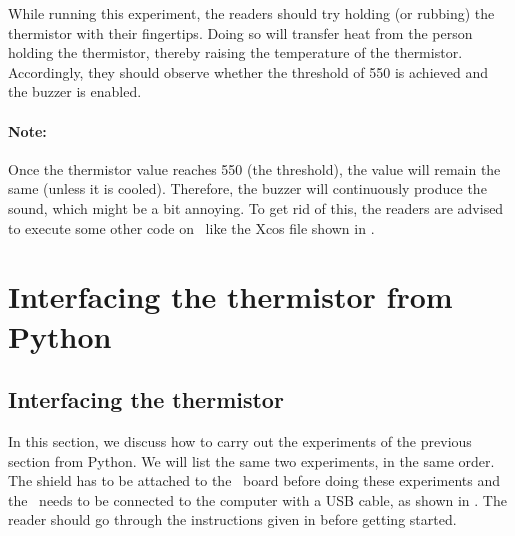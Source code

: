 \begin{enumerate}
        While running this experiment,
        the readers should try holding (or rubbing) the thermistor with their fingertips.
        Doing so will transfer heat from the person holding the
        thermistor, thereby raising the temperature of the thermistor.
        Accordingly, they should observe whether the threshold of 550 is achieved
        and the buzzer is enabled.

        \paragraph{Note:} Once the thermistor value reaches 550 (the threshold), the value will remain the same
        (unless it is cooled). Therefore, the buzzer will continuously produce the sound, which might be
        a bit annoying. To get rid of this, the readers are advised to
        execute some other code on \arduino\ like the Xcos file shown in
        .
\end{enumerate}


\section{Interfacing the thermistor from Python}
\subsection{Interfacing the thermistor}
In this section, we discuss how to carry out the experiments of the
previous section from Python.  We will list the same two experiments,
in the same order.  The shield has to be attached to the \arduino\ board
before doing these experiments and the \arduino\ needs to be connected to the computer
with a USB cable, as shown in .
The reader should go through the instructions given in
 before getting started.


